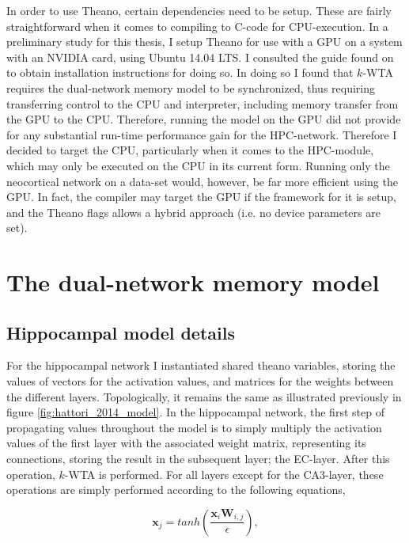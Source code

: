 In order to use Theano, certain dependencies need to be setup. These are fairly straightforward when it comes to compiling to C-code for CPU-execution. In a preliminary study for this thesis, I setup Theano for use with a GPU on a system with an NVIDIA card, using Ubuntu 14.04 LTS. I consulted the guide found on \citep{LISA-lab2015b} to obtain installation instructions for doing so. In doing so I found that $k$-WTA requires the dual-network memory model to be synchronized, thus requiring transferring control to the CPU and interpreter, including memory transfer from the GPU to the CPU. Therefore, running the model on the GPU did not provide for any substantial run-time performance gain for the HPC-network. Therefore I decided to target the CPU, particularly when it comes to the HPC-module, which may only be executed on the CPU in its current form. Running only the neocortical network on a data-set would, however, be far more efficient using the GPU. In fact, the compiler may target the GPU if the framework for it is setup, and the Theano flags allows a hybrid approach (i.e. no device parameters are set).


\section{The dual-network memory model}

\subsection{Hippocampal model details}

For the hippocampal network I instantiated shared theano variables, storing the values of vectors for the activation values, and matrices for the weights between the different layers. Topologically, it remains the same as illustrated previously in figure \ref{fig:hattori_2014_model}. In the hippocampal network, the first step of propagating values throughout the model is to simply multiply the activation values of the first layer with the associated weight matrix, representing its connections, storing the result in the subsequent layer; the EC-layer. After this operation, $k$-WTA is performed. For all layers except for the CA3-layer, these operations are simply performed according to the following equations,

\begin{equation}\label{eq:transfer_function_hpc}
    \textbf{x}_j = tanh (\frac{\textbf{x}_i \textbf{W}_{i,j}}{\epsilon}),
\end{equation}

